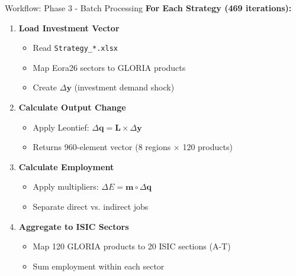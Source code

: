 \documentclass[10pt]{beamer}
\begin{document}
\begin{frame}{Workflow: Phase 3 - Batch Processing}
\textbf{For Each Strategy (469 iterations):}

\vspace{0.3cm}

\begin{enumerate}
    \item \textbf{Load Investment Vector}
    \begin{itemize}
        \item Read \texttt{Strategy\_*.xlsx}
        \item Map Eora26 sectors to GLORIA products
        \item Create $\Delta\mathbf{y}$ (investment demand shock)
    \end{itemize}

    \item \textbf{Calculate Output Change}
    \begin{itemize}
        \item Apply Leontief: $\Delta\mathbf{q} = \mathbf{L} \times \Delta\mathbf{y}$
        \item Returns 960-element vector (8 regions $\times$ 120 products)
    \end{itemize}

    \item \textbf{Calculate Employment}
    \begin{itemize}
        \item Apply multipliers: $\Delta E = \mathbf{m} \circ \Delta\mathbf{q}$
        \item Separate direct vs. indirect jobs
    \end{itemize}

    \item \textbf{Aggregate to ISIC Sectors}
    \begin{itemize}
        \item Map 120 GLORIA products to 20 ISIC sections (A-T)
        \item Sum employment within each sector
    \end{itemize}
\end{enumerate}
\end{frame}
\end{document}

